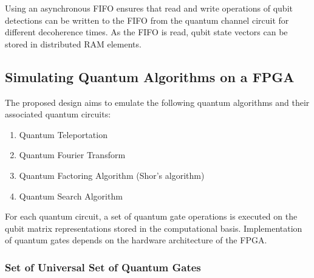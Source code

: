 Using an asynchronous FIFO ensures that read and write operations of qubit detections can be written to the FIFO from the quantum channel circuit for different decoherence times. As the FIFO is read, qubit state vectors can be stored in distributed RAM elements. 

\subsection{Simulating Quantum Algorithms on a FPGA \label{subsec:req-sim-qualgorithms}}

The proposed design aims to emulate the following quantum algorithms and their associated quantum circuits:
\begin{enumerate}
	\item 
	Quantum Teleportation
	\item 
	Quantum Fourier Transform
	\item 
	Quantum Factoring Algorithm (Shor's algorithm)
	\item 
	Quantum Search Algorithm
\end{enumerate}
For each quantum circuit, a set of quantum gate operations is executed on the qubit matrix representations stored in the computational basis. Implementation of quantum gates depends on the hardware architecture of the FPGA. 

\subsubsection{Set of Universal Set of Quantum Gates}

